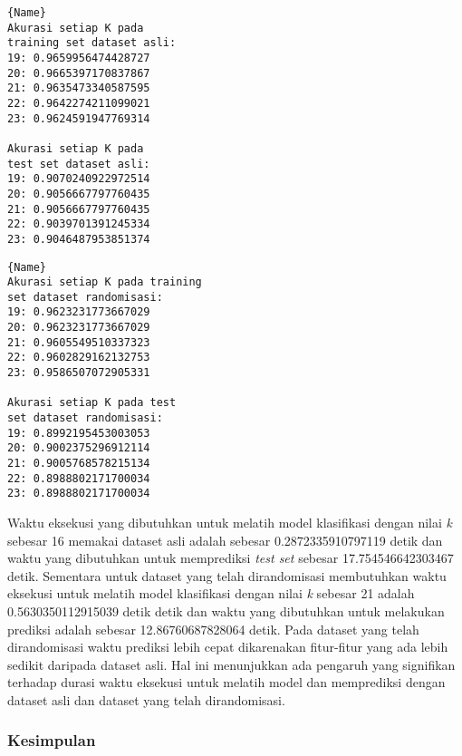 \noindent\begin{minipage}{.46\textwidth}
	\begin{lstlisting}[caption=Akurasi Dataset Asli,frame=tlrb, label=mobile_sensor_akurasi_asli]{Name}
Akurasi setiap K pada 
training set dataset asli: 
19: 0.9659956474428727
20: 0.9665397170837867
21: 0.9635473340587595
22: 0.9642274211099021
23: 0.9624591947769314

Akurasi setiap K pada 
test set dataset asli: 
19: 0.9070240922972514
20: 0.9056667797760435
21: 0.9056667797760435
22: 0.9039701391245334
23: 0.9046487953851374
	\end{lstlisting}
	\end{minipage}\hfill
	\begin{minipage}{.46\textwidth}
	\begin{lstlisting}[caption=Akurasi Dataset Randomisasi,frame=tlrb, label=mobile_sensor_akurasi_randomisasi]{Name}
Akurasi setiap K pada training 
set dataset randomisasi: 
19: 0.9623231773667029
20: 0.9623231773667029
21: 0.9605549510337323
22: 0.9602829162132753
23: 0.9586507072905331

Akurasi setiap K pada test 
set dataset randomisasi: 
19: 0.8992195453003053
20: 0.9002375296912114
21: 0.9005768578215134
22: 0.8988802171700034
23: 0.8988802171700034
	\end{lstlisting}
\end{minipage}

Waktu eksekusi yang dibutuhkan untuk melatih model klasifikasi dengan nilai \textit{k} sebesar 16 memakai dataset asli adalah sebesar 0.2872335910797119 detik dan waktu yang dibutuhkan untuk memprediksi \textit{test set} sebesar 17.754546642303467 detik. Sementara untuk dataset yang telah dirandomisasi membutuhkan waktu eksekusi untuk melatih model klasifikasi dengan nilai \textit{k} sebesar 21 adalah 0.5630350112915039 detik detik dan waktu yang dibutuhkan untuk melakukan prediksi adalah sebesar 12.86760687828064 detik. Pada dataset yang telah dirandomisasi waktu prediksi lebih cepat dikarenakan fitur-fitur yang ada lebih sedikit daripada dataset asli. Hal ini menunjukkan ada pengaruh yang signifikan terhadap durasi waktu eksekusi untuk melatih model dan memprediksi dengan dataset asli dan dataset yang telah dirandomisasi.

\subsubsection{Kesimpulan}
\label{subsubsec:pengujian-klasifikasi-kesimpulan}

